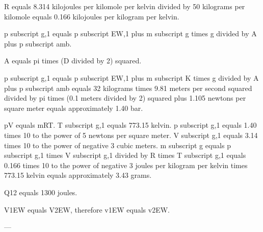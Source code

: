R equals 8.314 kilojoules per kilomole per kelvin divided by 50 kilograms per kilomole equals 0.166 kilojoules per kilogram per kelvin.  

p subscript g,1 equals p subscript EW,1 plus m subscript g times g divided by A plus p subscript amb.  

A equals pi times (D divided by 2) squared.  

p subscript g,1 equals p subscript EW,1 plus m subscript K times g divided by A plus p subscript amb equals 32 kilograms times 9.81 meters per second squared divided by pi times (0.1 meters divided by 2) squared plus 1.105 newtons per square meter equals approximately 1.40 bar.  

pV equals mRT.  
T subscript g,1 equals 773.15 kelvin.  
p subscript g,1 equals 1.40 times 10 to the power of 5 newtons per square meter.  
V subscript g,1 equals 3.14 times 10 to the power of negative 3 cubic meters.  
m subscript g equals p subscript g,1 times V subscript g,1 divided by R times T subscript g,1 equals 0.166 times 10 to the power of negative 3 joules per kilogram per kelvin times 773.15 kelvin equals approximately 3.43 grams.

Q12 equals 1300 joules.  

V1EW equals V2EW, therefore v1EW equals v2EW.  

---